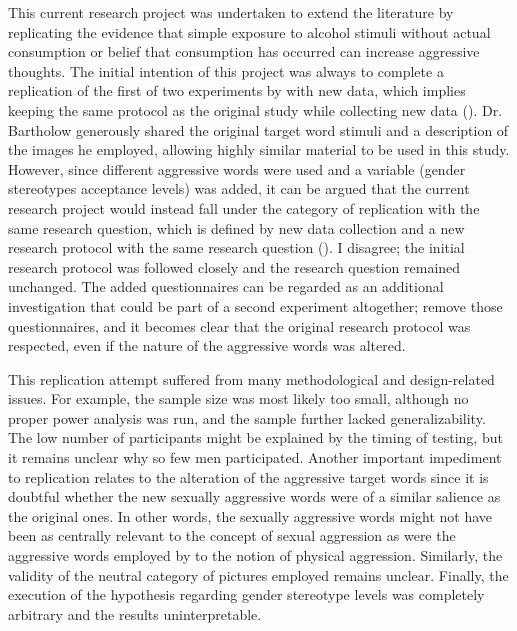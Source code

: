 \documentclass[serif, authorddate, twocolumn, empirical]{jote-article}
\begin{document}
This current research project was undertaken to extend the literature by replicating the evidence that simple exposure to alcohol stimuli without actual consumption or belief that consumption has occurred can increase aggressive thoughts. The initial intention of this project was always to complete a replication of the first of two experiments by \textcite{BartholowHeinz2006} with new data, which implies keeping the same protocol as the original study while collecting new data (\cite{NWO}). Dr. Bartholow generously shared the original target word stimuli and a description of the images he employed, allowing highly similar material to be used in this study. However, since different aggressive words were used and a variable (gender stereotypes acceptance levels) was added, it can be argued that the current research project would instead fall under the category of replication with the same research question, which is defined by new data collection and a new research protocol with the same research question (\cite{NWO}). I disagree; the initial research protocol was followed closely and the research question remained unchanged. The added questionnaires can be regarded as an additional investigation that could be part of a second experiment altogether; remove those questionnaires, and it becomes clear that the original research protocol was respected, even if the nature of the aggressive words was altered.

This replication attempt suffered from many methodological and design-related issues. For example, the sample size was most likely too small, although no proper power analysis was run, and the sample further lacked generalizability. The low number of participants might be explained by the timing of testing, but it remains unclear why so few men participated. Another important impediment to replication relates to the alteration of the aggressive target words since it is doubtful whether the new sexually aggressive words were of a similar salience as the original ones. In other words, the sexually aggressive words might not have been as centrally relevant to the concept of sexual aggression as were the aggressive words employed by \textcite{BartholowHeinz2006} to the notion of physical aggression. Similarly, the validity of the neutral category of pictures employed remains unclear. Finally, the execution of the hypothesis regarding gender stereotype levels was completely arbitrary and the results uninterpretable.
\end{document}
